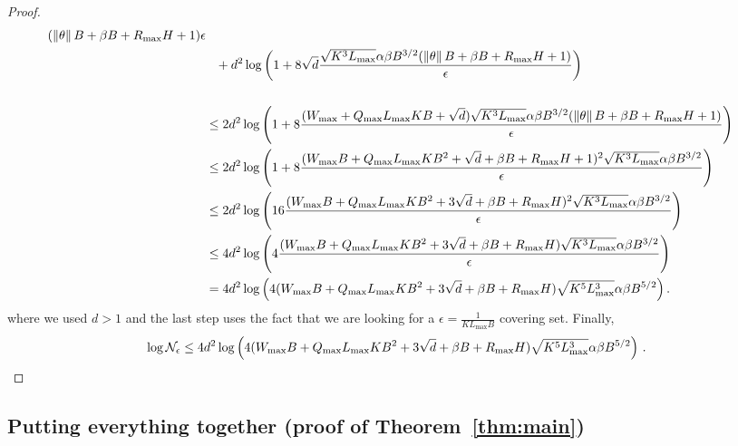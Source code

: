 \begin{proof}
\begin{align*}
{{        (\left\|\theta\right\| B + \beta B +R_{\max}H + 1)}{\epsilon}} \\&\phantom{=}+ 
        d^2 \log \left({1 + 8\sqrt{d}\frac{\sqrt{K^3L_{\max}}\alpha\beta B^{3/2} (\left\|\theta\right\| B + \beta B +R_{\max} H + 1)}{\epsilon}}\right) \\
        \\ & \leq 2d^2\log  \left({1 + 8\frac{(W_{\max} + Q_{\max}L_{\max}K B + \sqrt{d})\sqrt{K^3L_{\max}}\alpha\beta B^{3/2} (\left\|\theta\right\| B + 
        \beta B +R_{\max} H + 1)}{\epsilon}}\right) \\
        & \leq 2d^2 \log \left({1 + 8\frac{(W_{\max} B + Q_{\max}L_{\max}K B^2 + \sqrt{d}+ \beta B +R_{\max} H +1)^2\sqrt{K^3L_{\max}}\alpha\beta B^{3/2}}{\epsilon}}\right) \\
        & \leq 2d^2 \log \left({16\frac{(W_{\max} B + Q_{\max}L_{\max}K B^2 + 3\sqrt{d}+ \beta B +R_{\max} H)^2\sqrt{K^3L_{\max}}\alpha\beta B^{3/2}}{\epsilon}}\right) \\
        & \leq 4d^2 \log \left({4\frac{(W_{\max} B + Q_{\max}L_{\max}K B^2  + 3\sqrt{d}+ \beta B +R_{\max} H)\sqrt{K^3L_{\max}}\alpha\beta B^{3/2}}{\epsilon}}\right) \\
        & = 4d^2 \log \left({4(W_{\max} B + Q_{\max}L_{\max}K B^2 + 3\sqrt{d}+ \beta B +R_{\max} H)\sqrt{K^5L^3_{\max}}\alpha\beta B^{5/2}}\right).
    \end{align*}
    where we used $d > 1$ and the last step uses the fact that we are looking for a $\epsilon = \frac{1}{K L_{\max} B}$ covering set. Finally,
    \begin{equation*}
        \log \mathcal{N}_{\epsilon} \leq 4d^2 \log \left({4(W_{\max} B +  Q_{\max}L_{\max}K B^2 + 3\sqrt{d}+ \beta B +R_{\max} H)\sqrt{K^5L^3_{\max}}\alpha\beta B^{5/2}}\right)\,.
    \end{equation*}
\end{proof}


\subsection{Putting everything together (proof of Theorem~\ref{thm:main})}
\label{app:putting-together-main}

